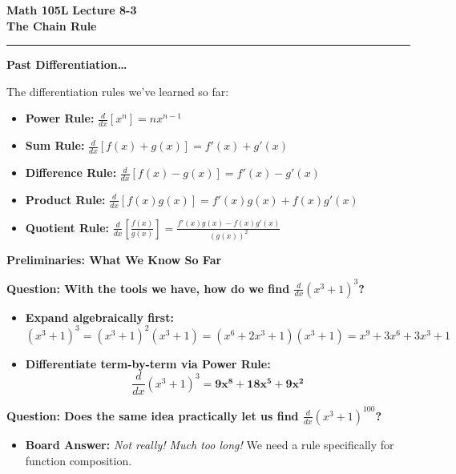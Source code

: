 \documentclass[10.5pt]{article}
\begin{document}
\noindent \textbf{\large Math 105L} \hfill \textbf{\large Lecture 8-3}\\[1pt]
{\textbf{\Large The Chain Rule}}\\[-5pt]
\rule{\textwidth}{1.2pt}

\vspace{0.03in}

\textbf{\large Past Differentiation\dots}

The differentiation rules we've learned so far:
\begin{itemize}[leftmargin=1.2em, topsep=1pt, itemsep=2pt]
  \item \textbf{Power Rule:} $\frac{d}{dx}[x^n] = n x^{n-1}$
  \item \textbf{Sum Rule:} $\frac{d}{dx}[f(x) + g(x)] = f'(x) + g'(x)$
  \item \textbf{Difference Rule:} $\frac{d}{dx}[f(x) - g(x)] = f'(x) - g'(x)$
  \item \textbf{Product Rule:} $\frac{d}{dx}[f(x)g(x)] = f'(x)g(x) + f(x)g'(x)$
  \item \textbf{Quotient Rule:} $\frac{d}{dx}\left[\frac{f(x)}{g(x)}\right] = \frac{f'(x)g(x) - f(x)g'(x)}{(g(x))^2}$
\end{itemize}

\vspace{0.03in}

\textbf{\large Preliminaries: What We Know So Far}

\textbf{Question: With the tools we have, how do we find $\frac{d}{dx} (x^3 + 1)^3$?}
\begin{itemize}[leftmargin=1.2em, label=$\bullet$, topsep=1pt, itemsep=2pt]
  \item \textbf{Expand algebraically first:}
  \[
    (x^3 + 1)^3 = (x^3 + 1)^2(x^3 + 1) = (x^6 + 2x^3 + 1)(x^3 + 1) = x^9 + 3x^6 + 3x^3 + 1
  \]
  \item \textbf{Differentiate term-by-term via Power Rule:}
  \[
    \frac{d}{dx}(x^3 + 1)^3 = \mathbf{9x^8 + 18x^5 + 9x^2}
  \]
\end{itemize}

\textbf{Question: Does the same idea practically let us find $\frac{d}{dx}(x^3 + 1)^{100}$?}
\begin{itemize}[leftmargin=1.2em, label=$\bullet$, topsep=0pt, itemsep=1pt]
  \item \textbf{Board Answer:} \textit{Not really! Much too long!} We need a rule specifically for function composition.
\end{itemize}
\end{document}
